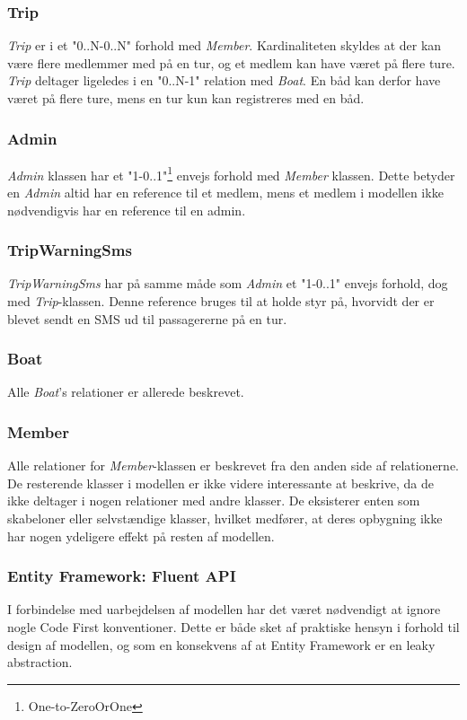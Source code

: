 \subsubsection*{Trip}
\textit{Trip} er i et "0..N-0..N" forhold med \textit{Member}. Kardinaliteten skyldes at der kan være flere medlemmer med på en tur, og et medlem kan have været på flere ture. \textit{Trip} deltager ligeledes i en "0..N-1" relation med \textit{Boat}. En båd kan derfor have været på flere ture, mens en tur kun kan registreres med en båd.

\subsubsection*{Admin}
\textit{Admin} klassen har et "1-0..1"\footnote{One-to-ZeroOrOne} envejs forhold med \textit{Member} klassen. Dette betyder en \textit{Admin} altid har en reference til et medlem, mens et medlem i modellen ikke nødvendigvis har en reference til en admin.

\subsubsection*{TripWarningSms}
\textit{TripWarningSms} har på samme måde som \textit{Admin} et "1-0..1" envejs forhold, dog med \textit{Trip}-klassen. Denne reference bruges til at holde styr på, hvorvidt der er blevet sendt en SMS ud til passagererne på en tur.

\subsubsection*{Boat}
Alle \textit{Boat}'s relationer er allerede beskrevet.

\subsubsection*{Member}
Alle relationer for \textit{Member}-klassen er beskrevet fra den anden side af relationerne.\\

De resterende klasser i modellen er ikke videre interessante at beskrive, da de ikke deltager i nogen relationer med andre klasser. De eksisterer enten som skabeloner eller selvstændige klasser, hvilket medfører, at deres opbygning ikke har nogen ydeligere effekt på resten af modellen.

\subsubsection{Entity Framework: Fluent API}
I forbindelse med uarbejdelsen af modellen har det været nødvendigt at ignore nogle Code First konventioner. Dette er både sket af praktiske hensyn i forhold til design af modellen, og som en konsekvens af at Entity Framework er en leaky abstraction.

